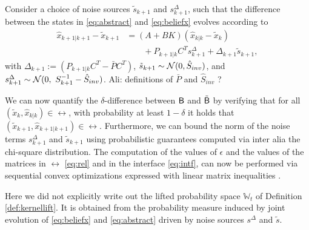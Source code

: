 \documentclass{ifacconf}
\newcommand{\red}[1]{{\color{red} #1}}
\renewcommand{\axx}[1]{{\color{orange} Ali: #1}}
\begin{document}
Consider a choice of noise sources $\tilde{{s}}_{k+1}$ and $s^\Delta_{k+1}$, such that the difference between the states in \eqref{eq:abstract} and \eqref{eq:beliefx} evolves according to
\begin{equation}
\begin{aligned}
 \hat x_{k+1|k+1}-  \tilde x_{k+1}&=(A+BK)(\hat x_{k|k}-\tilde x_{k})  \\ & \qquad + P_{k+1|k}C^T s^\Delta_{k+1}+\Delta_{k+1} {\tilde{s}}_{k+1},
\end{aligned}
\end{equation}
with $\Delta_{k+1}:=(P_{k+1|k}C^T-  \bar P C^T)$, $ \tilde{{s}}_{k+1}\sim \mathcal{N} (0,\hat{S}_{inv})$, and $ {s}^\Delta_{k+1}\sim  \mathcal{N} (0,\  S_{k+1}^{-1}-\hat{S}_{inv})$. \axx{definitions of $\bar{P}$ and $\hat{S}_{inv}$ ? }

We can now quantify the $\delta$-difference between $\mathsf{B}$ and $\tilde {\mathsf{B}}$ by verifying that for all  $(\tilde x_k,\hat x_{k|k})\in \rel$, with probability at least $1-\delta$ it holds that $(\tilde x_{k+1},\hat x_{k+1|k+1})\in \rel$. %
Furthermore, we can bound the norm of the noise terms ${s}^\Delta_{k+1}$ and $ \tilde{{s}}_{k+1}$ using probabilistic guarantees computed via inter alia the chi-square distribution. The computation of the values of $\epsilon$ and the values of the matrices  in $\rel$ \eqref{eq:rel} and in the interface \eqref{eq:intf}, can now be performed via sequential convex optimizations expressed with linear matrix inequalities \citep{haesaert2017verification}.


\begin{remark}
  Here we did not explicitly write out the lifted probability space $\mathbb{W}_t$ of Definition \ref{def:kernellift}. It is obtained from the probability measure induced by joint evolution of \eqref{eq:beliefx} and \eqref{eq:abstract} driven by noise sources $s^\Delta$ and $ {\tilde{s}} $.
 \end{remark}
\end{document}
